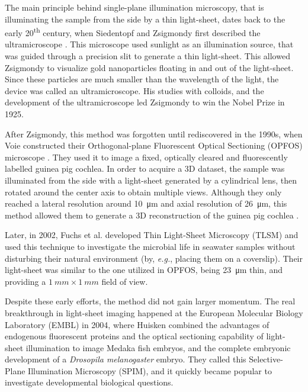   

  The main principle behind single-plane illumination microscopy, that is illuminating the sample from the side by a thin light-sheet, dates back to the early 20\textsuperscript{th} century, when Siedentopf and Zsigmondy first described the ultramicroscope \cite{siedentopf_uber_1902}. This microscope used sunlight as an illumination source, that was guided through a precision slit to generate a thin light-sheet. This allowed Zsigmondy to visualize gold nanoparticles floating in and out of the light-sheet. Since these particles are much smaller than the wavelength of the light, the device was called an ultramicroscope. His studies with colloids, and the development of the ultramicroscope led Zsigmondy to win the Nobel Prize in 1925.

  After Zsigmondy, this method was forgotten until rediscovered in the 1990s, when Voie \etal constructed their Orthogonal-plane Fluorescent Optical Sectioning (OPFOS) microscope \cite{voie_orthogonal-plane_1993}. They used it to image a fixed, optically cleared and fluorescently labelled guinea pig cochlea. In order to acquire a 3D dataset, the sample was illuminated from the side with a light-sheet generated by a cylindrical lens, then rotated around the center axis to obtain multiple views. Although they only reached a lateral resolution around \SI{10}{\micro m} and axial resolution of \SI{26}{\micro m}, this method allowed them to generate a 3D reconstruction of the guinea pig cochlea \cite{voie_three-dimensional_1995}.

  Later, in 2002, Fuchs et al. developed Thin Light-Sheet Microscopy (TLSM) \cite{fuchs_thin_2002} and used this technique to investigate the microbial life in seawater samples without disturbing their natural environment (by, \textit{e.g.}, placing them on a coverslip). Their light-sheet was similar to the one utilized in OPFOS, being \SI{23}{\micro m} thin, and providing a $\SI{1}{mm} \times \SI{1}{mm}$ field of view.

  Despite these early efforts, the method did not gain larger momentum. The real breakthrough in light-sheet imaging happened at the European Molecular Biology Laboratory (EMBL) in 2004, where Huisken \etal \cite{huisken_optical_2004} combined the advantages of endogenous fluorescent proteins and the optical sectioning capability of light-sheet illumination to image Medaka fish embryos, and the complete embryonic development of a \textit{Drosopila melanogaster} embryo. They called this Selective-Plane Illumination Microscopy (SPIM), and it quickly became popular to investigate developmental biological questions.

